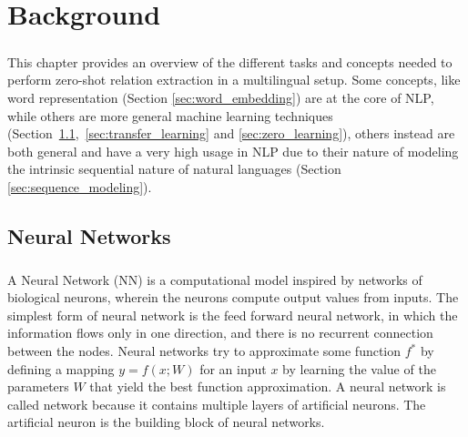 \chapter{Background}
\label{chpt:2}
\paragraph{}

This chapter provides an overview of the different tasks and concepts needed to perform zero-shot relation extraction in a multilingual setup.  Some concepts, like word representation (Section \ref{sec:word_embedding}) are at the core of NLP, while others are more general machine learning techniques (Section~\ref{sec:nn},~\ref{sec:transfer_learning} and \ref{sec:zero_learning}), others instead are both general and have a very high usage in NLP due to their nature of modeling the intrinsic sequential nature of natural languages (Section \ref{sec:sequence_modeling}). 




\section{Neural Networks}
\label{sec:nn}

\paragraph{}
A Neural Network (NN) is a computational model inspired by networks of biological neurons, wherein the neurons compute output values from inputs. The simplest form of neural network is the feed forward neural network, in which the information flows only in one direction, and there is no recurrent connection between the nodes. Neural networks try to approximate some function $f^{*}$ by defining a mapping $y = f(x; W)$ for an input $x$ by  learning the value of the parameters $W$ that yield the best function approximation. A neural network is called network because it contains multiple layers of artificial neurons. The artificial neuron is the building block of neural networks.

